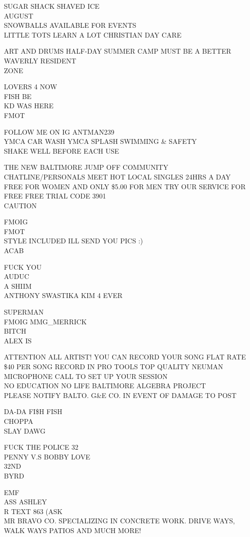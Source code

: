 \documentclass[10pt,letterpaper]{article}
\begin{document}
SUGAR SHACK SHAVED ICE\\
AUGUST\\
SNOWBALLS AVAILABLE FOR EVENTS\\
LITTLE TOTS LEARN A LOT CHRISTIAN DAY CARE

ART AND DRUMS HALF{-}DAY SUMMER CAMP MUST BE A BETTER WAVERLY RESIDENT\\
ZONE

LOVERS 4 NOW\\
FISH BE\\
KD WAS HERE\\
FMOT

FOLLOW ME ON IG ANTMAN239\\
YMCA CAR WASH YMCA SPLASH SWIMMING \& SAFETY\\
SHAKE WELL BEFORE EACH USE

THE NEW BALTIMORE JUMP OFF COMMUNITY CHATLINE/PERSONALS MEET HOT LOCAL SINGLES 24HRS A DAY FREE FOR WOMEN AND ONLY \$5.00 FOR MEN TRY OUR SERVICE FOR FREE FREE TRIAL CODE 3901\\
CAUTION

FMOIG\\
FMOT\\
STYLE INCLUDED ILL SEND YOU PICS :)\\
ACAB

FUCK YOU\\
AUDUC\\
A SHIIM\\
ANTHONY SWASTIKA KIM 4 EVER

SUPERMAN\\
FMOIG MMG\_MERRICK\\
BITCH\\
ALEX IS

ATTENTION ALL ARTIST!  YOU CAN RECORD YOUR SONG FLAT RATE \$40 PER SONG RECORD IN PRO TOOLS TOP QUALITY NEUMAN MICROPHONE CALL TO SET UP YOUR SESSION\\
NO EDUCATION NO LIFE BALTIMORE ALGEBRA PROJECT\\
PLEASE NOTIFY BALTO. G\&E CO. IN EVENT OF DAMAGE TO POST

DA{-}DA FI\$H FISH\\
CHOPPA\\
SLAY DAWG

FUCK THE POLICE 32\\
PENNY V.S BOBBY LOVE\\
32ND\\
BYRD

EMF\\
ASS ASHLEY\\
R TEXT 863 (ASK\\
MR BRAVO CO. SPECIALIZING IN CONCRETE WORK.  DRIVE WAYS, WALK WAYS PATIOS AND MUCH MORE!
\end{document}

